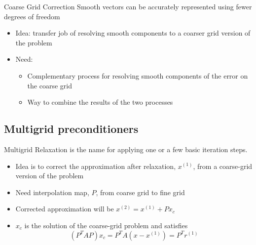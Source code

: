 \begin{frame}{Coarse Grid Correction}
  Smooth vectors can be accurately represented using fewer
  degrees of freedom
  \begin{itemize}
  \item Idea: transfer job of resolving smooth components to a
coarser grid version of the problem
\item Need:
  \begin{itemize}
    \item Complementary process for resolving smooth
components of the error on the coarse grid
\item Way to combine the results of the two processes

  \end{itemize}

  \end{itemize}
\end{frame}
\subsection{Multigrid preconditioners}
\begin{frame}{Multigrid}
  Relaxation is the name for applying one or a few basic
  iteration steps.
  \begin{itemize}
  \item Idea is to correct the approximation after relaxation, $x^{(1)}$,
from a coarse-grid version of the problem
\item Need interpolation map, $P$, from coarse grid to fine grid
\item Corrected approximation will be $x^{(2)} = x^{(1)} + Px_c$
\item $x_c$ is the solution of the coarse-grid problem and satisfies
  \begin{equation*}
    (P^T A P)x_c = P^T A(x - x^{(1)}) = P^T r^{(1)}
  \end{equation*}


  \end{itemize}
\end{frame}

